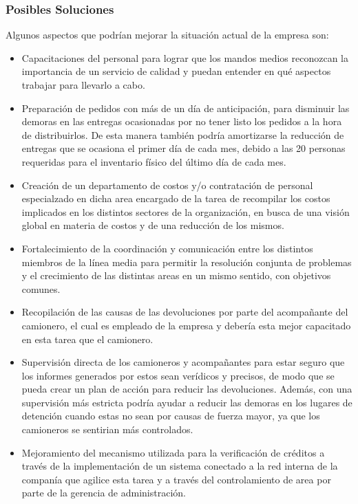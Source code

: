 \documentclass[a4paper,10pt]{article}
\begin{document}
	\subsubsection{Posibles Soluciones}

Algunos aspectos que podrían mejorar la situación actual de la empresa son:

\begin{itemize}
\item Capacitaciones del personal para lograr que los mandos medios reconozcan la importancia de un servicio de calidad y puedan entender en qué aspectos trabajar para llevarlo a cabo.
\item Preparación de pedidos con más de un día de anticipación, para disminuir las demoras en las entregas ocasionadas por no tener listo los pedidos a la hora de distribuirlos. De esta manera también podría amortizarse la reducción de entregas que se ocasiona el primer día de cada mes, debido a las 20 personas requeridas para el inventario físico del último día de cada mes. 
\item Creación de un departamento de costos y/o contratación de personal especialzado en dicha area encargado de la tarea de recompilar los costos implicados en los distintos sectores de la organización, en busca de una visión global en materia de costos y de una reducción de los mismos.
\item Fortalecimiento de la coordinación y comunicación entre los distintos miembros de la línea media para permitir la resolución conjunta de problemas y el crecimiento de las distintas areas en un mismo sentido, con objetivos comunes.
\item Recopilación de las causas de las devoluciones por parte del acompañante del camionero, el cual es empleado de la empresa y debería esta mejor capacitado en esta tarea que el camionero.
\item Supervisión directa de los camioneros y acompañantes para estar seguro que los informes generados por estos sean verídicos y precisos, de modo que se pueda crear un plan de acción para reducir las devoluciones. Además, con una supervisión más estricta podría ayudar a reducir las demoras en los lugares de detención cuando estas no sean por causas de fuerza mayor, ya que los camioneros se sentirian más controlados.
\item Mejoramiento del mecanismo utilizada para la verificación de créditos a través de la implementación de un sistema conectado a la red interna de la companía que agilice esta tarea y a través del controlamiento de area por parte de la gerencia de administración.

\end{itemize}
	
\end{document}
